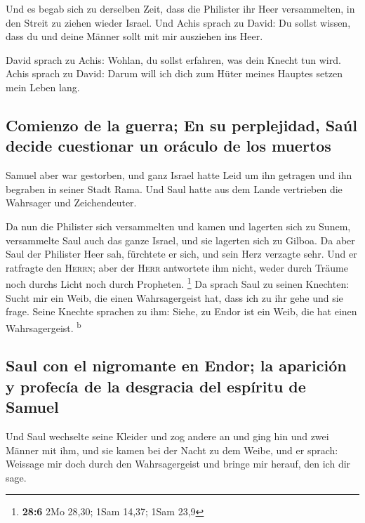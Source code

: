  Und es begab sich zu derselben Zeit, dass die Philister
ihr Heer versammelten, in den Streit zu ziehen wieder Israel. Und Achis
sprach zu David: Du sollst wissen, dass du und deine Männer sollt mit
mir ausziehen ins Heer.

 David sprach zu Achis: Wohlan, du sollst erfahren, was
dein Knecht tun wird. Achis sprach zu David: Darum will ich dich zum
Hüter meines Hauptes setzen mein Leben lang.

\hypertarget{comienzo-de-la-guerra-en-su-perplejidad-sauxfal-decide-cuestionar-un-oruxe1culo-de-los-muertos}{%
\subsection{Comienzo de la guerra; En su perplejidad, Saúl decide
cuestionar un oráculo de los
muertos}\label{comienzo-de-la-guerra-en-su-perplejidad-sauxfal-decide-cuestionar-un-oruxe1culo-de-los-muertos}}

 Samuel aber war gestorben, und ganz Israel hatte Leid um
ihn getragen und ihn begraben in seiner Stadt Rama. Und Saul hatte aus
dem Lande vertrieben die Wahrsager und Zeichendeuter.

 Da nun die Philister sich versammelten und kamen und
lagerten sich zu Sunem, versammelte Saul auch das ganze Israel, und sie
lagerten sich zu Gilboa.  Da aber Saul der Philister Heer
sah, fürchtete er sich, und sein Herz verzagte sehr.  Und
er ratfragte den \textsc{Herrn}; aber der \textsc{Herr} antwortete ihm
nicht, weder durch Träume noch durchs Licht noch durch Propheten.
\footnote{\textbf{28:6} 2Mo 28,30; 1Sam 14,37; 1Sam 23,9} 
Da sprach Saul zu seinen Knechten: Sucht mir ein Weib, die einen
Wahrsagergeist hat, dass ich zu ihr gehe und sie frage. Seine Knechte
sprachen zu ihm: Siehe, zu Endor ist ein Weib, die hat einen
Wahrsagergeist. \textsuperscript{b}

\hypertarget{saul-con-el-nigromante-en-endor-la-apariciuxf3n-y-profecuxeda-de-la-desgracia-del-espuxedritu-de-samuel}{%
\subsection{Saul con el nigromante en Endor; la aparición y profecía de
la desgracia del espíritu de
Samuel}\label{saul-con-el-nigromante-en-endor-la-apariciuxf3n-y-profecuxeda-de-la-desgracia-del-espuxedritu-de-samuel}}

 Und Saul wechselte seine Kleider und zog andere an und
ging hin und zwei Männer mit ihm, und sie kamen bei der Nacht zu dem
Weibe, und er sprach: Weissage mir doch durch den Wahrsagergeist und
bringe mir herauf, den ich dir sage.


